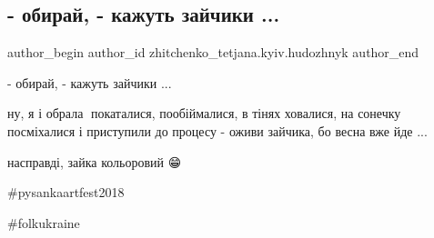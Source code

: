  
 
 
 
 

\subsection{- обирай, - кажуть зайчики ...}
\label{sec:19_03_2018.fb.zhitchenko_tetjana.kyiv.hudozhnyk.1.obyraj_kazhut_zajchyky}

\ifcmt
 author_begin
   author_id zhitchenko_tetjana.kyiv.hudozhnyk
 author_end
\fi

- обирай, - кажуть зайчики ...

ну, я і обрала🐰 покаталися, пообіймалися, в тінях ховалися, на сонечку
посміхалися і приступили до процесу - оживи зайчика, бо весна вже йде ...

насправді, зайка кольоровий 😁

\#pysankaartfest2018

\#folkukraine
